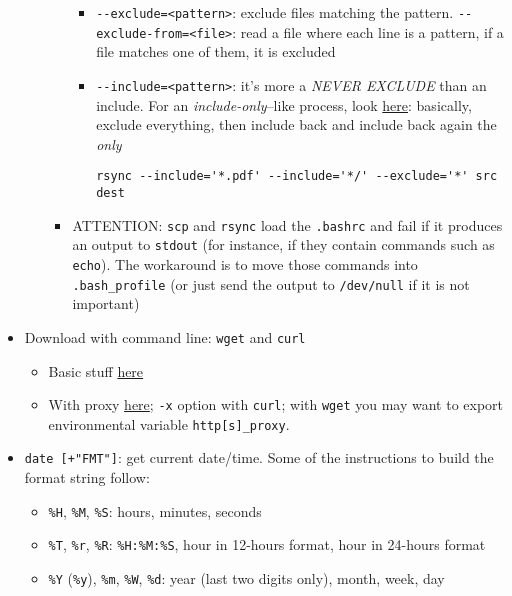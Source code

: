 \documentclass[a4paper,12pt,%
              final%
              ]{article}
\begin{document}
\begin{itemize}
\begin{itemize}
\begin{itemize}
\begin{itemize}
              \item \verb|--exclude=<pattern>|: exclude files matching the pattern. \verb|--exclude-from=<file>|: read a file where each line is a pattern, if a file matches one of them, it is excluded
              \item \verb|--include=<pattern>|: it's more a \emph{NEVER EXCLUDE} than an include. For an \emph{include-only}--like process, look \href{https://unix.stackexchange.com/questions/2161/rsync-filter-copying-one-pattern-only}{here}: basically, exclude everything, then include back and include back again the \emph{only}
\begin{verbatim}
rsync --include='*.pdf' --include='*/' --exclude='*' src dest
\end{verbatim}
            \end{itemize}
          \item ATTENTION: \texttt{scp} and \texttt{rsync} load the \texttt{.bashrc} and fail if it produces an output to \texttt{stdout} (for instance, if they contain commands such as \texttt{echo}). The workaround is to move those commands into \texttt{.bash\_profile} (or just send the output to \verb|/dev/null| if it is not important)
        \end{itemize}
    \end{itemize}
  \item Download with command line: \texttt{wget} and \texttt{curl}
    \begin{itemize}
      \item Basic stuff \href{https://linuxconfig.org/download-file-from-url-on-linux-using-command-line}{here}
      \item With proxy \href{https://www.cyberciti.biz/faq/linux-unix-curl-command-with-proxy-username-password-http-options/}{here}; \verb|-x| option with \texttt{curl}; with \texttt{wget} you may want to export environmental variable \verb|http[s]_proxy|.
    \end{itemize}
  \item \verb|date [+"FMT"]|: get current date/time. Some of the instructions to build the format string follow:
    \begin{itemize}
      \item \verb|%H|, \verb|%M|, \verb|%S|: hours, minutes, seconds
      \item \verb|%T|, \verb|%r|, \verb|%R|: \verb|%H:%M:%S|, hour in 12-hours format, hour in 24-hours format
      \item \verb|%Y| (\verb|%y|), \verb|%m|, \verb|%W|, \verb|%d|: year (last two digits only), month, week, day

\end{itemize}
\end{itemize}
\end{document}
